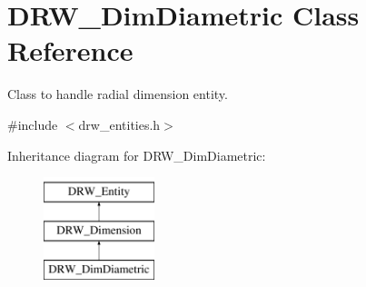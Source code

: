 \hypertarget{classDRW__DimDiametric}{\section{D\-R\-W\-\_\-\-Dim\-Diametric Class Reference}
\label{classDRW__DimDiametric}
}


Class to handle radial dimension entity.  




{\ttfamily \#include $<$drw\-\_\-entities.\-h$>$}

Inheritance diagram for D\-R\-W\-\_\-\-Dim\-Diametric\-:\begin{figure}[H]
\begin{center}
\leavevmode
\includegraphics[height=3.000000cm]{classDRW__DimDiametric}
\end{center}
\end{figure}
